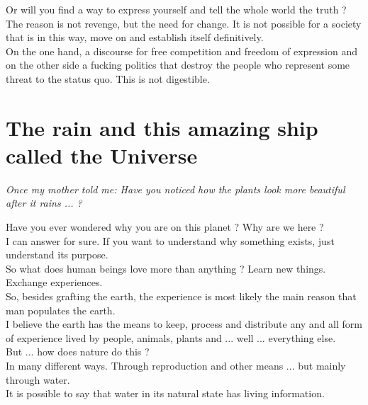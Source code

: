 \documentclass[11pt]{book}
\begin{document}
\noindent Or will you find a way to express yourself and tell the whole world the truth ? \\

\noindent The reason is not revenge, but the need for change. It is not possible for a society that is in this way, move on and establish itself definitively. \\

\noindent On the one hand, a discourse for free competition and freedom of expression and on the other side a fucking politics that destroy the people who represent some threat to the status quo. This is not digestible.

\chapter{The rain and this amazing ship called the Universe}

\noindent \begin{center} \emph{Once my mother told me: Have you noticed how the plants look more beautiful after it rains ... ?} \end{center}

\noindent Have you ever wondered why you are on this planet ? Why are we here ? \\

\noindent I can answer for sure. If you want to understand why something exists, just understand its purpose. \\

\noindent So what does human beings love more than anything ? Learn new things. Exchange experiences. \\

\noindent So, besides grafting the earth, the experience is most likely the main reason that man populates the earth. \\

\noindent I believe the earth has the means to keep, process and distribute any and all form of experience lived by people, animals, plants and ... well ... everything else. \\

\noindent But ... how does nature do this ? \\

\noindent In many different ways. Through reproduction and other means ... but mainly through water. \\

\noindent It is possible to say that water in its natural state has living information. \\
\end{document}
